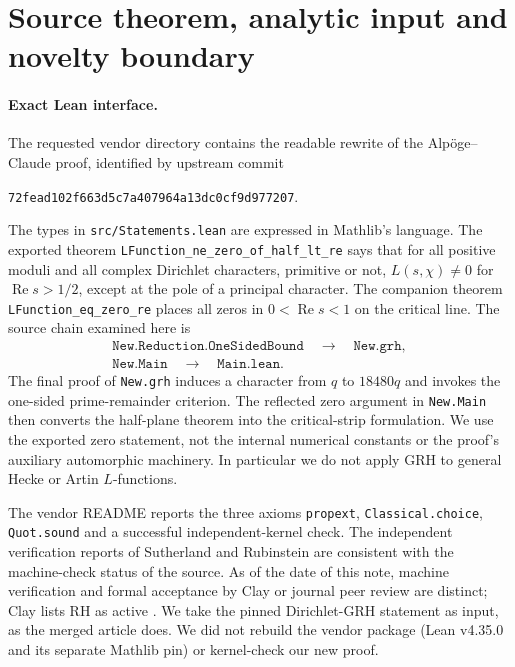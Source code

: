 \documentclass[11pt]{article}
\theoremstyle{remark}\newtheorem{remark}[theorem]{Remark}
\DeclareMathOperator{\Ree}{Re}
\begin{document}
\section{Source theorem, analytic input and novelty boundary}
\label{sec:source}
\paragraph{Exact Lean interface.} The requested vendor directory \cite{vendor} contains the readable rewrite of the Alp\"oge--Claude proof, identified by upstream commit
\begin{center}\small\texttt{72fead102f663d5c7a407964a13dc0cf9d977207}.
\end{center}
The types in \texttt{src/Statements.lean} are expressed in Mathlib's language. The exported theorem \texttt{LFunction\_ne\_zero\_of\_half\_lt\_re} says that for all positive moduli and all complex Dirichlet characters, primitive or not, $L(s,\chi)\ne0$ for $\Ree s>1/2$, except at the pole of a principal character. The companion theorem \texttt{LFunction\_eq\_zero\_re} places all zeros in $0<\Ree s<1$ on the critical line. The source chain examined here is
\[
\begin{gathered}
 \texttt{New.Reduction.OneSidedBound}\quad\longrightarrow\quad
 \texttt{New.grh},\\
 \texttt{New.Main}\quad\longrightarrow\quad
 \texttt{Main.lean}.
\end{gathered}
\]
The final proof of \texttt{New.grh} induces a character from $q$ to $18480q$ and invokes the one-sided prime-remainder criterion. The reflected zero argument in \texttt{New.Main} then converts the half-plane theorem into the critical-strip formulation. We use the exported zero statement, not the internal numerical constants or the proof's auxiliary automorphic machinery. In particular we do not apply GRH to general Hecke or Artin $L$-functions.

The vendor README reports the three axioms \texttt{propext}, \texttt{Classical.choice}, \texttt{Quot.sound} and a successful independent-kernel check. The independent verification reports of Sutherland and Rubinstein \cite{sutherland,rubinstein} are consistent with the machine-check status of the source. As of the date of this note, machine verification and formal acceptance by Clay or journal peer review are distinct; Clay lists RH as active \cite{clay}. We take the pinned Dirichlet-GRH statement as input, as the merged article does. We did not rebuild the vendor package (Lean v4.35.0 and its separate Mathlib pin) or kernel-check our new proof.
\end{document}
